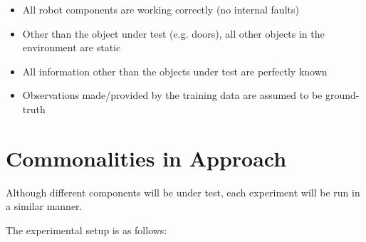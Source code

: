   \begin{itemize}

    \item All robot components are working correctly (no internal faults)

    \item Other than the object under test (e.g. doors), all other objects in the
          environment are static

    \item All information other than the objects under test are perfectly known

    \item Observations made/provided by the training data are assumed to be
          ground-truth

  \end{itemize}


  \section{ Commonalities in Approach }
  Although different components will be under test, each experiment will be run
  in a similar manner.

  The experimental setup is as follows:

